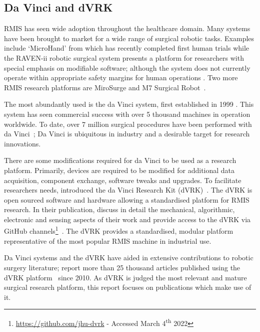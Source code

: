 \documentclass[english]{sobraep}
\begin{document}
\subsection{Da Vinci and dVRK}
RMIS has seen wide adoption throughout the healthcare domain. Many systems have been brought to market for a wide range of surgical robotic tasks. Examples include `MicroHand' from \citeauthor{microhand2} which has recently completed first human trials \cite{microhand2} while the RAVEN-ii robotic surgical system presents a platform for researchers with special emphasis on modifiable software; although the system does not currently operate within appropriate safety margins for human operations \cite{raven-ii}. Two more RMIS research platforms are MiroSurge and M7 Surgical Robot~\cite[Table 1]{other-rmis-machines}.

The most abundantly used is the da Vinci system, first established in 1999 \cite{ergonomics, 10-years-dvrk}. This system has seen commercial success with over 5 thousand machines in operation worldwide. To date, over 7 million surgical procedures have been performed with da Vinci~\cite{10-years-dvrk}; Da Vinci is ubiquitous in industry and a desirable target for research innovations.

There are some modifications required for da Vinci to be used as a research platform. Primarily, devices are required to be modified for additional data acquisition, component exchange, software tweaks and upgrades. To facilitate researchers needs, \citeauthor{dvrk} introduced the da Vinci Research Kit (dVRK)~\cite{dvrk}. The dVRK is open sourced software and hardware allowing a standardised platform for RMIS research. In their publication, \citeauthor{dvrk} discuss in detail the mechanical, algorithmic, electronic and sensing aspects of their work and provide access to the dVRK via GitHub channels\footnote{\url{https://github.com/jhu-dvrk} - Accessed March 4\textsuperscript{th} 2022}~\cite{dvrk}. The dVRK provides a standardised, modular platform representative of the most popular RMIS machine in industrial use. 

Da Vinci systems and the dVRK have aided in extensive contributions to robotic surgery literature; \citeauthor{10-years-dvrk} report more than 25 thousand articles published using the dVRK platform~\cite{10-years-dvrk} since 2010. As dVRK is judged the most relevant and mature surgical research platform, this report focuses on publications which make use of it.  
\end{document}
